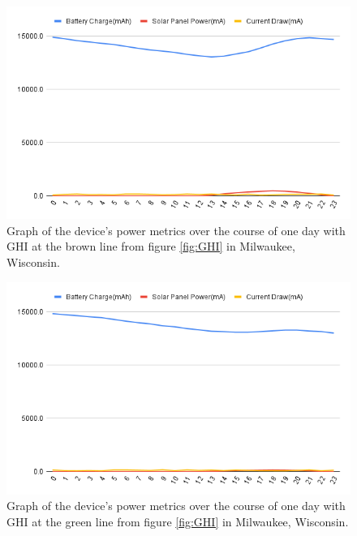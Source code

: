 \documentclass[fleqn,10pt]{SelfArx} %
\begin{document}
	\begin{figure}[h]
		\centering
		\includegraphics[width=1\linewidth]{Figures/brown_line_power}
		\caption[Power Consumption Graph]{Graph of the device's power metrics over the course of one day with GHI at the brown line from figure \ref{fig:GHI} in Milwaukee, Wisconsin.}
		\label{fig:ElecMod}
	\end{figure} 
	
	\begin{figure}[h]
		\centering
		\includegraphics[width=1\linewidth]{Figures/green_line_power}
		\caption[Power Consumption Graph]{Graph of the device's power metrics over the course of one day with GHI at the green line from figure \ref{fig:GHI} in Milwaukee, Wisconsin.}
		\label{fig:botPowerGen}
	\end{figure} 
	
\end{document}

